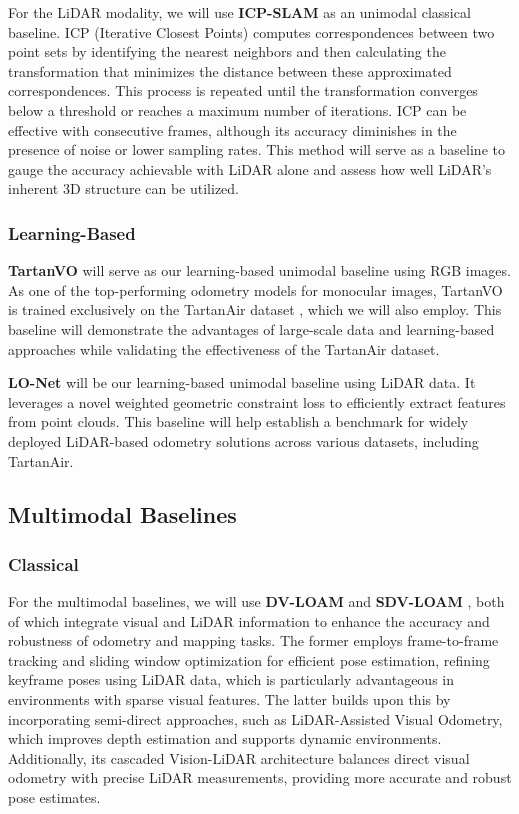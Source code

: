 \documentclass[11pt,a4paper]{article}
\begin{document}
For the LiDAR modality, we will use \textbf{ICP-SLAM} \cite{KISS-ICP} as an unimodal classical baseline. ICP (Iterative Closest Points) computes correspondences between two point sets by identifying the nearest neighbors and then calculating the transformation that minimizes the distance between these approximated correspondences. This process is repeated until the transformation converges below a threshold or reaches a maximum number of iterations. ICP can be effective with consecutive frames, although its accuracy diminishes in the presence of noise or lower sampling rates. This method will serve as a baseline to gauge the accuracy achievable with LiDAR alone and assess how well LiDAR’s inherent 3D structure can be utilized.

\subsubsection{Learning-Based}

\textbf{TartanVO} \cite{tartanvo} will serve as our learning-based unimodal baseline using RGB images. As one of the top-performing odometry models for monocular images, TartanVO is trained exclusively on the TartanAir dataset \cite{tartanair}, which we will also employ. This baseline will demonstrate the advantages of large-scale data and learning-based approaches while validating the effectiveness of the TartanAir dataset.

\textbf{LO-Net} \cite{lo-net} will be our learning-based unimodal baseline using LiDAR data. It leverages a novel weighted geometric constraint loss to efficiently extract features from point clouds. This baseline will help establish a benchmark for widely deployed LiDAR-based odometry solutions across various datasets, including TartanAir.

\subsection{Multimodal Baselines}
\subsubsection{Classical}
For the multimodal baselines, we will use \textbf{DV-LOAM} \cite{dv-loam} and \textbf{SDV-LOAM} \cite{sdv-loam}, both of which integrate visual and LiDAR information to enhance the accuracy and robustness of odometry and mapping tasks. The former employs frame-to-frame tracking and sliding window optimization for efficient pose estimation, refining keyframe poses using LiDAR data, which is particularly advantageous in environments with sparse visual features. The latter builds upon this by incorporating semi-direct approaches, such as LiDAR-Assisted Visual Odometry, which improves depth estimation and supports dynamic environments. Additionally, its cascaded Vision-LiDAR architecture balances direct visual odometry with precise LiDAR measurements, providing more accurate and robust pose estimates.
\end{document}
